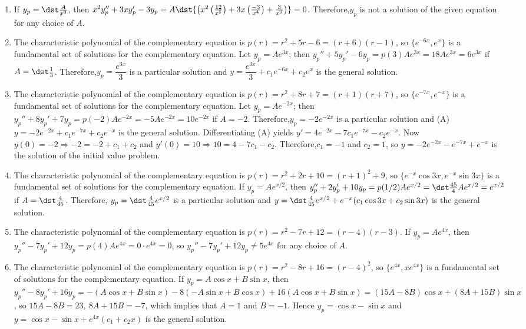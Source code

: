 \documentclass[openany]{book}
\newenvironment{sectionSolutions}{
 \begin{enumerate}[item-label={\thesection.\arabic{enumi}.}]
}{
 \end{enumerate}
}
\begin{document}
\begin{sectionSolutions}
\item
If $y_p=\dst\frac{A}{ x^3}$, then  $x^2y_p''+3xy_p'-3y_p=
A\dst{\left(x^2\left(\frac{12}{ x^5}\right)+3x\left(\frac{-3}{ x^4}\right)
+\frac{3}{ x^3}\right)}=0$. Therefore,$y_p$ is not a solution of the
given equation for any choice of $A$.


\item
The characteristic polynomial of the complementary equation is
$p(r)=r^2+5r-6=(r+6)(r-1)$, so
 $\{e^{-6x},e^{x}\}$
is a fundamental set of solutions for the complementary equation.
Let $y_p=Ae^{3x}$; then
$y_p''+5y_p'-6y_p=p(3)Ae^{3x}=18Ae^{3x}=6e^{3x}$ if
$A=\dst\frac{1}{3}$.
Therefore,$y_p=\dfrac{e^{3x}}{3}$ is a particular solution and
 $y=\dfrac{e^{3x}}{3}+c_1e^{-6x}+c_2e^{x}$ is the general solution.


\item
The characteristic polynomial of the complementary equation is
$p(r)=r^2+8r+7=(r+1)(r+7)$, so
 $\{e^{-7x},e^{-x}\}$
is a fundamental set of solutions for the complementary equation.
Let $y_p=Ae^{-2x}$; then
$y_p''+8y_p'+7y_p=p(-2)Ae^{-2x}=-5Ae^{-2x}=10e^{-2x}$ if $A=-2$.
Therefore,$y_p=-2e^{-2x}$ is a particular solution  and
(A) $y=-2e^{-2x}+c_1e^{-7x}+c_2e^{-x}$ is the general solution.
Differentiating (A) yields
 $y'=4e^{-2x}-7c_1e^{-7x}-c_2e^{-x}$.
Now $y(0)=-2 \Rightarrow -2=-2+c_1+c_2$ and $y'(0)=10\Rightarrow
10=4-7c_1-c_2$. Therefore,$c_1=-1$ and $c_2=1$, so
$y=-2e^{-2x}-e^{-7x}+e^{-x}$
 is the solution of the initial value problem.


\item
The characteristic polynomial of the complementary equation is
$p(r)=r^2+2r+10=(r+1)^2+9$, so
$\{e^{-x}\cos3x,e^{-x}\sin3x\}$
is a fundamental set of solutions for the complementary equation.
If $y_p=Ae^{x/2}$, then
$y_p''+2y_p'+10y_p=p(1/2)Ae^{x/2}=\dst\frac{45}{4}Ae^{x/2}=e^{x/2}$
if $A=\dst\frac{4}{45}$.
Therefore, $y_p=\dst\frac{4}{45}e^{x/2}$ is a particular solution and
$y=\dst\frac{4}{45}e^{x/2}+e^{-x}(c_1\cos3x+c_2\sin3x)$
 is the general solution.



\item
The characteristic polynomial of the complementary equation is
$p(r)=r^2-7r+12=(r-4)(r-3)$. If $y_p=Ae^{4x}$, then
$y_p''-7y_p'+12y_p=p(4)Ae^{4x}=0\cdot e^{4x}=0$, so
$y_p''-7y_p'+12y_p\ne5e^{4x}$ for any choice of $A$.


\item
The characteristic polynomial of the complementary equation is
$p(r)=r^2-8r+16=(r-4)^2$, so
 $\{e^{4x},xe^{4x}\}$
is a fundamental set of solutions for the complementary equation.
If $y_p=A\cos x+B\sin x$, then
$y_p''-8y_p'+16y_p=-(A\cos x+B\sin x)-8(-A\sin x+B\cos x)+
16(A\cos x+B\sin x)=(15A-8B)\cos x+(8A+15B)\sin x$, so
$15A-8B=23,\ 8A+15B=-7$, which implies that $A=1$ and $B=-1$.
Hence $y_p=\cos x-\sin x$ and
 $y=\cos x-\sin x+e^{4x}(c_1+c_2x)$ is the general solution.



\end{sectionSolutions}
\end{document}
